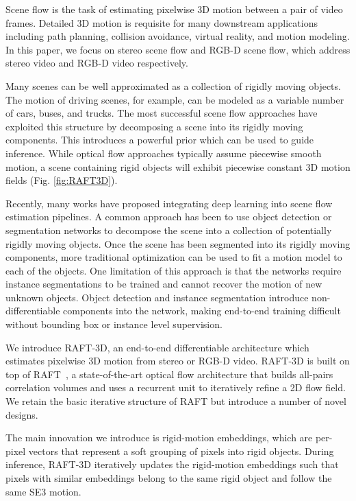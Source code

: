 \documentclass[final]{cvpr}
\begin{document}
Scene flow is the task of estimating pixelwise 3D motion between a pair of video frames\cite{vedula1999three}. Detailed 3D motion is requisite for many downstream applications including path planning, collision avoidance, virtual reality, and motion modeling. In this paper, we focus on stereo scene flow and RGB-D scene flow, which address stereo video and RGB-D video respectively. 

Many scenes can be well approximated as a collection of rigidly moving objects. The motion of driving scenes, for example, can be modeled as a variable number of cars, buses, and trucks. The most successful scene flow approaches have exploited this structure by decomposing a scene into its rigidly moving components\cite{menze2015object,vogel20113d,vogel20113d,vogel20153d,ma2019deep,behl2017bounding,jaimez2015motion,jaimez2015primal,kumar2017monocular}. This introduces a powerful prior which can be used to guide inference. While optical flow approaches typically assume piecewise smooth motion, a scene containing rigid objects will exhibit piecewise constant 3D motion fields (Fig. \ref{fig:RAFT3D}).

Recently, many works have proposed integrating deep learning into scene flow estimation pipelines. A common approach has been to use object detection\cite{behl2017bounding,cao2019learning} or segmentation \cite{behl2017bounding,ma2019deep,lv2018learning,ren2017cascaded} networks to decompose the scene into a collection of potentially rigidly moving objects. Once the scene has been segmented into its rigidly moving components, more traditional optimization can be used to fit a motion model to each of the objects. One limitation of this approach is that the networks require instance segmentations to be trained and cannot recover the motion of new unknown objects. Object detection and instance segmentation introduce non-differentiable components into the network, making end-to-end training difficult without bounding box or instance level supervision.

We introduce RAFT-3D, an end-to-end differentiable architecture which estimates pixelwise 3D motion from stereo or RGB-D video. RAFT-3D is built on top of RAFT~\cite{teed2020raft}, a state-of-the-art optical flow architecture that builds all-pairs correlation volumes and uses a recurrent unit to iteratively refine a 2D flow field. We retain the basic iterative structure of RAFT but introduce a number of novel designs.

The main innovation we introduce is rigid-motion embeddings, which are per-pixel vectors that represent a soft grouping of pixels into rigid objects.  During inference, RAFT-3D iteratively updates the rigid-motion embeddings such that pixels with similar embeddings belong to the same rigid object and follow the same SE3 motion. 
\end{document}
